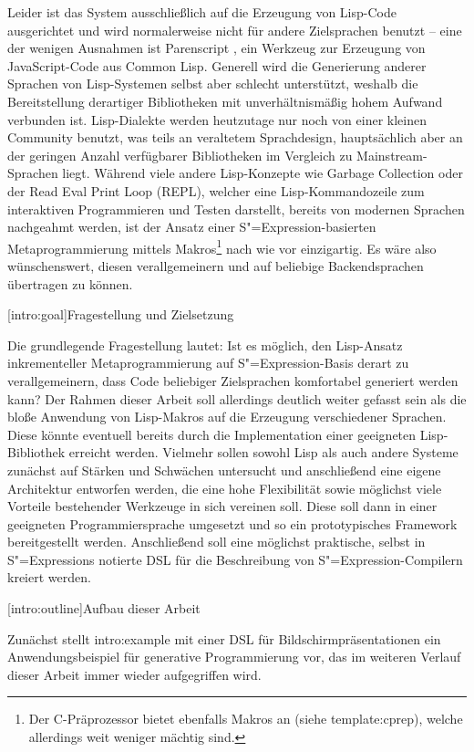 \documentclass[12pt, a4paper, bibgerm]{scrbook}
\newcommand\lsection{}
\newcommand\sref{}
\newcommand{\sees}[1]{(siehe \sref{#1})}
\newcommand{\sexp}{S"=Expression}
\newcommand{\sexps}{S"=Expressions}
\newcommand{\mprog}{Metaprogrammierung}
\begin{document}
Leider ist das System ausschließlich auf die Erzeugung von Lisp-Code
ausgerichtet und wird normalerweise nicht für andere Zielsprachen
benutzt -- eine der wenigen Ausnahmen ist Parenscript
\cite{Parenscript}, ein Werkzeug zur Erzeugung von JavaScript-Code aus
Common Lisp. Generell wird die Generierung anderer Sprachen von
Lisp-Systemen selbst aber schlecht unterstützt, weshalb die
Bereitstellung derartiger Bibliotheken mit unverhältnismäßig hohem
Aufwand verbunden ist. Lisp-Dialekte werden heutzutage nur noch von
einer kleinen Community benutzt, was teils an veraltetem Sprachdesign,
hauptsächlich aber an der geringen Anzahl verfügbarer Bibliotheken im
Vergleich zu Mainstream-Sprachen liegt. Während viele andere
Lisp-Konzepte wie Garbage Collection oder der Read Eval
Print Loop (REPL), welcher eine Lisp-Kommandozeile zum interaktiven
Programmieren und Testen darstellt, bereits von modernen Sprachen nachgeahmt
werden, ist der Ansatz einer \sexp-basierten \mprog{} mittels
Makros\footnote{Der C-Präprozessor bietet ebenfalls Makros an
  \sees{template:cprep}, welche allerdings weit weniger mächtig sind.}
nach wie vor einzigartig. Es wäre also wünschenswert, diesen
verallgemeinern und auf beliebige Backendsprachen übertragen zu können.

\lsection[intro:goal]{Fragestellung und Zielsetzung}

Die grundlegende Fragestellung lautet: Ist es möglich, den Lisp-Ansatz
inkrementeller \mprog{} auf \sexp{}-Basis derart zu verallgemeinern,
dass Code beliebiger Zielsprachen komfortabel generiert werden kann? Der
Rahmen dieser Arbeit soll allerdings deutlich weiter gefasst sein als
die bloße Anwendung von Lisp-Makros auf die Erzeugung verschiedener
Sprachen. Diese könnte eventuell bereits durch die Implementation einer
geeigneten Lisp-Bibliothek erreicht werden. Vielmehr sollen sowohl Lisp
als auch andere Systeme zunächst auf Stärken und Schwächen untersucht
und anschließend eine eigene Architektur entworfen werden, die eine hohe
Flexibilität sowie möglichst viele Vorteile bestehender Werkzeuge in sich
vereinen soll. Diese soll dann in einer geeigneten Programmiersprache
umgesetzt und so ein prototypisches Framework bereitgestellt
werden. Anschließend soll eine möglichst praktische, selbst in \sexps{}
notierte DSL für die Beschreibung von \sexp{}-Compilern kreiert werden.

\lsection[intro:outline]{Aufbau dieser Arbeit}

Zunächst stellt \sref{intro:example} mit einer DSL für
Bildschirmpräsentationen ein Anwendungsbeispiel für generative
Programmierung vor, das im weiteren Verlauf dieser Arbeit immer wieder
aufgegriffen wird.
\end{document}
